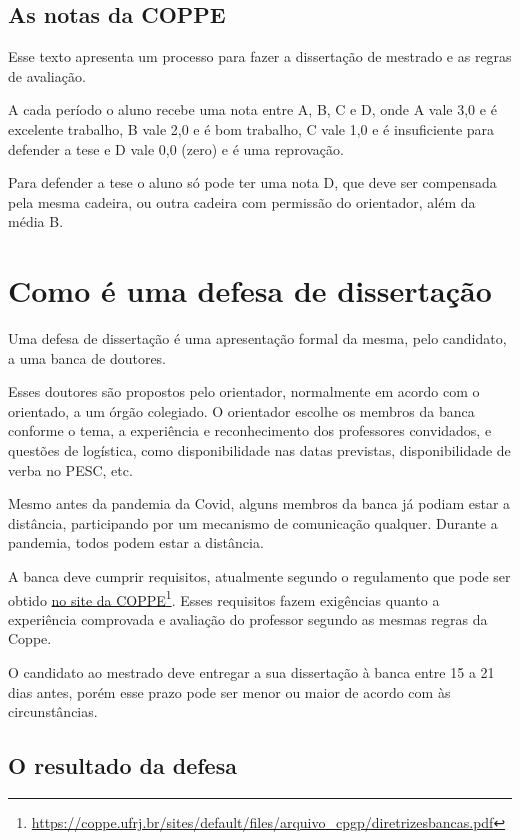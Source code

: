 \documentclass{book}
\begin{document}
\section{As notas da COPPE}

Esse texto apresenta um processo para fazer a dissertação de mestrado e as regras de avaliação.

A cada período o aluno recebe uma nota entre A, B, C e D, onde A vale 3,0 e é excelente trabalho, B vale 2,0 e é bom trabalho, C vale 1,0 e é insuficiente para defender a tese e D vale 0,0 (zero) e é uma reprovação.

Para defender a tese o aluno só pode ter uma nota D, que deve ser compensada pela mesma cadeira, ou outra cadeira com permissão do orientador, além da média B.



\chapter{Como é uma defesa de dissertação}

Uma defesa de dissertação é uma apresentação formal da mesma, pelo candidato, a uma banca de doutores.

Esses doutores são propostos pelo orientador, normalmente em acordo com o orientado, a um órgão colegiado. O orientador escolhe os membros da banca conforme o tema, a experiência e reconhecimento dos professores convidados, e questões de logística, como disponibilidade nas datas previstas, disponibilidade de verba no PESC, etc.

Mesmo antes da pandemia da Covid, alguns membros da banca já podiam estar a distância, participando por um mecanismo de comunicação qualquer. Durante a pandemia, todos podem estar a distância.

A banca deve cumprir requisitos, atualmente segundo o regulamento que pode ser obtido  \href{https://coppe.ufrj.br/pt-br/node/3464}{no site da COPPE}\footnote{\url{https://coppe.ufrj.br/sites/default/files/arquivo_cpgp/diretrizesbancas.pdf}}. Esses requisitos fazem exigências quanto a experiência comprovada e avaliação do professor segundo as mesmas regras da Coppe.

O candidato ao mestrado deve entregar a sua dissertação à banca entre 15 a 21 dias antes, porém esse prazo pode ser menor ou maior de acordo com às circunstâncias. 

\section{O resultado da defesa}
\end{document}
